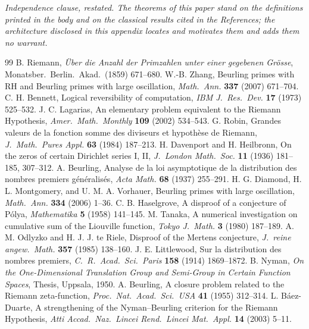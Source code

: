 \documentclass[twocolumn,10pt]{article}
\theoremstyle{plain}
\theoremstyle{definition}
\begin{document}
\medskip
\noindent\emph{Independence clause, restated. The theorems of this paper stand on the definitions printed in the body and on the classical results cited in the References; the architecture disclosed in this appendix locates and motivates them and adds them no warrant.}


\begin{thebibliography}{99}\small
{} B. Riemann, \emph{\"Uber die Anzahl der Primzahlen unter einer gegebenen Gr\"osse}, Monatsber.\ Berlin.\ Akad.\ (1859) 671--680.
 W.-B. Zhang, Beurling primes with RH and Beurling primes with large oscillation, \emph{Math.\ Ann.} \textbf{337} (2007) 671--704.
 C. H. Bennett, Logical reversibility of computation, \emph{IBM J.\ Res.\ Dev.} \textbf{17} (1973) 525--532.
 J. C. Lagarias, An elementary problem equivalent to the Riemann Hypothesis, \emph{Amer.\ Math.\ Monthly} \textbf{109} (2002) 534--543.
 G. Robin, Grandes valeurs de la fonction somme des diviseurs et hypoth\`ese de Riemann, \emph{J.\ Math.\ Pures Appl.} \textbf{63} (1984) 187--213.
 H. Davenport and H. Heilbronn, On the zeros of certain Dirichlet series I, II, \emph{J.\ London Math.\ Soc.} \textbf{11} (1936) 181--185, 307--312.
 A. Beurling, Analyse de la loi asymptotique de la distribution des nombres premiers g\'en\'eralis\'es, \emph{Acta Math.} \textbf{68} (1937) 255--291.
 H. G. Diamond, H. L. Montgomery, and U. M. A. Vorhauer, Beurling primes with large oscillation, \emph{Math.\ Ann.} \textbf{334} (2006) 1--36.
 C. B. Haselgrove, A disproof of a conjecture of P\'olya, \emph{Mathematika} \textbf{5} (1958) 141--145.
 M. Tanaka, A numerical investigation on cumulative sum of the Liouville function, \emph{Tokyo J.\ Math.} \textbf{3} (1980) 187--189.
 A. M. Odlyzko and H. J. J. te Riele, Disproof of the Mertens conjecture, \emph{J.\ reine angew.\ Math.} \textbf{357} (1985) 138--160.
 J. E. Littlewood, Sur la distribution des nombres premiers, \emph{C.\ R.\ Acad.\ Sci.\ Paris} \textbf{158} (1914) 1869--1872.
 B. Nyman, \emph{On the One-Dimensional Translation Group and Semi-Group in Certain Function Spaces}, Thesis, Uppsala, 1950.
 A. Beurling, A closure problem related to the Riemann zeta-function, \emph{Proc.\ Nat.\ Acad.\ Sci.\ USA} \textbf{41} (1955) 312--314.
 L. B\'aez-Duarte, A strengthening of the Nyman--Beurling criterion for the Riemann Hypothesis, \emph{Atti Accad.\ Naz.\ Lincei Rend.\ Lincei Mat.\ Appl.} \textbf{14} (2003) 5--11.

\end{thebibliography}
\end{document}
